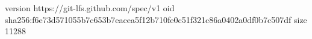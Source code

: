 version https://git-lfs.github.com/spec/v1
oid sha256:f6e73d571055b7c653b7eacea5f12b710fe0c51f321c86a0402a0df0b7c507df
size 11288
